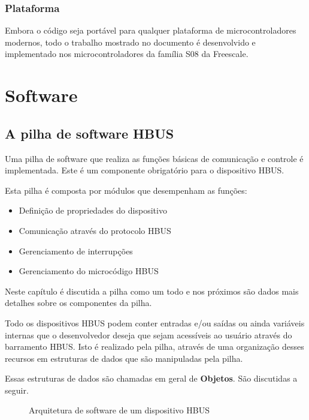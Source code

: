 \documentclass[11pt]{report}
\begin{document}
\section{Plataforma}

Embora o código seja portável para qualquer plataforma de microcontroladores modernos, todo o trabalho mostrado no documento é desenvolvido e implementado nos microcontroladores da família S08 da Freescale.

\part{Software}

\chapter{A pilha de software HBUS}

Uma pilha de software que realiza as funções básicas de comunicação e controle é implementada. Este é um componente obrigatório para o dispositivo HBUS.

Esta pilha é composta por módulos que desempenham as funções:

\begin{itemize}

\item Definição de propriedades do dispositivo
\item Comunicação através do protocolo HBUS
\item Gerenciamento de interrupções
\item Gerenciamento do microcódigo HBUS

\end{itemize}

Neste capítulo é discutida a pilha como um todo e nos próximos são dados mais detalhes sobre os componentes da pilha.

Todo os dispositivos HBUS podem conter entradas e/ou saídas ou ainda variáveis internas que o desenvolvedor deseja que sejam acessíveis ao usuário através do barramento HBUS. Isto é realizado pela pilha, através de uma organização desses recursos em estruturas de dados que são manipuladas pela pilha.

Essas estruturas de dados são chamadas em geral de \textbf{Objetos}. São discutidas a seguir.

\begin{figure}[h]
\centering

\caption{Arquitetura de software de um dispositivo HBUS}
\end{figure}
\end{document}
